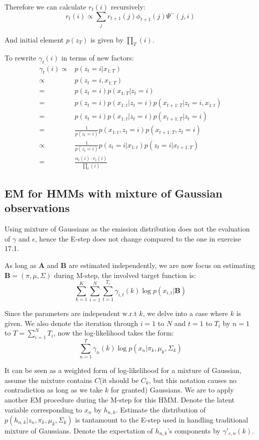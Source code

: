 \documentclass[UTF8]{ctexart}
\begin{document}
Therefore we can calculate $r_{t}(i)$ recursively:
$$r_{t}(i)\propto \sum_{j}r_{t+1}(j)\phi_{t+1}(j)\Psi^{-}(j,i)$$

And initial element $p(z_{T})$ is given by $\prod_{T}(i)$.

To rewrite $\gamma_{t}(i)$ in terms of new factors:
\begin{align}
\gamma_{t}(i)\propto&p(z_{t}=i|x_{1:T})\nonumber \\
\propto& p(z_{t}=i,x_{1:T}) \nonumber \\
=&p(z_{t}=i)p(x_{1:T}|z_{t}=i)\nonumber \\
=&p(z_{t}=i)p(x_{1:t}|z_{t}=i)p(x_{t+1:T}|z_{t}=i,x_{1:t}) \nonumber \\
=&p(z_{t}=i)p(x_{1:t}|z_{t}=i)p(x_{t+1:T}|z_{t}=i) \nonumber \\
=&\frac{1}{p(z_{t}=i)}p(x_{1:t},z_{t}=i)p(x_{t+1:T},z_{t}=i) \nonumber \\
\propto&\frac{1}{p(z_{t}=i)}p(z_{t}=i|x_{1:t})p(z_{t}=i|x_{t+1:T}) \nonumber \\
=&\frac{\alpha_{t}(i)\cdot r_{t}(i)}{\prod_{t}(i)} \nonumber
\end{align}

\subsection{EM for HMMs with mixture of Gaussian observations}
Using mixture of Gaussians as the emission distribution does not the evaluation of $\gamma$ and $\epsilon$, hence the E-step does not change compared to the one in exercise 17.1.

As long as $\textbf{A}$ and $\textbf{B}$ are estimated independently, we are now focus on estimating $\textbf{B}=(\pi,\mu,\Sigma)$ during M-step, the involved target function is:
$$\sum_{k=1}^{K}\sum_{i=1}^{N}\sum_{t=1}^{T_{i}}\gamma_{i,t}(k)\log p(x_{i,t}|\textbf{B})$$

Since the parameters are independent w.r.t $k$, we delve into a case where $k$ is given. We also denote the iteration through $i=1$ to $N$ and $t=1$ to $T_{i}$ by $n=1$ to $T=\sum_{i=1}^{N}T_{i}$, now the log-likelihood takes the form:
$$\sum_{n=1}^{T}\gamma_{n}(k)\log p(x_{n}|\pi_{k},\mu_{k},\Sigma_{k})$$

It can be seen as a weighted form of log-likelihood for a mixture of Gaussian, assume the mixture contains $C$(it should be $C_{k}$, but this notation causes no contradiction as long as we take $k$ for granted) Gaussians. We are to apply another EM procedure during the M-step for this HMM. Denote the latent variable corresponding to $x_{n}$ by $h_{n,k}$. Estimate the distribution of $p(h_{n,k}|z_{n},\pi_{k},\mu_{k},\Sigma_{k})$ is tantamount to the E-step used in handling traditional mixture of Gaussians. Denote the expectation of $h_{n,k}$'s components by $\gamma'_{c,n}(k)$.
\end{document}
